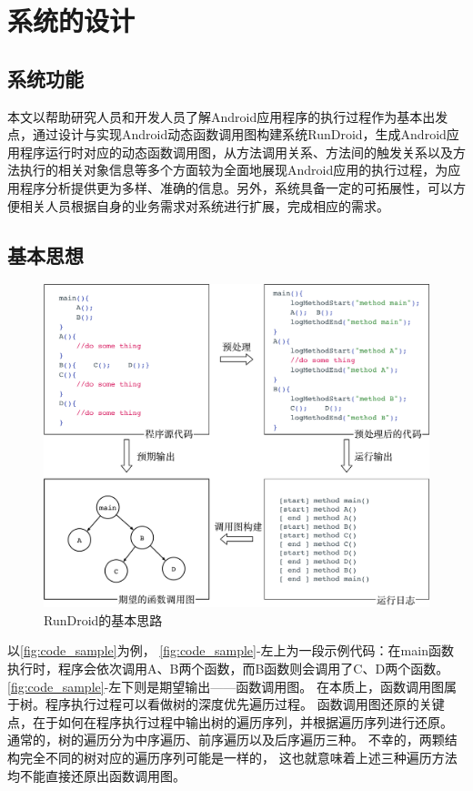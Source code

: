 \chapter{系统的设计}
\label{chp:design}


\section{系统功能}
本文以帮助研究人员和开发人员了解Android应用程序的执行过程作为基本出发点，通过设计与实现Android动态函数调用图构建系统RunDroid，生成Android应用程序运行时对应的动态函数调用图，从方法调用关系、方法间的触发关系以及方法执行的相关对象信息等多个方面较为全面地展现Android应用的执行过程，为应用程序分析提供更为多样、准确的信息。另外，系统具备一定的可拓展性，可以方便相关人员根据自身的业务需求对系统进行扩展，完成相应的需求。

\section{基本思想}



\begin{figure}[!ht]
	\centering
	\includegraphics[width=\textwidth]{./Figures/code-sample.png}
	\caption{RunDroid的基本思路}
	\label{fig:code_sample}
\end{figure}


以\autoref{fig:code_sample}为例，%
\autoref{fig:code_sample}-左上为一段示例代码：在main函数执行时，程序会依次调用A、B两个函数，而B函数则会调用了C、D两个函数。
\autoref{fig:code_sample}-左下则是期望输出——函数调用图。
在本质上，函数调用图属于树。程序执行过程可以看做树的深度优先遍历过程。
函数调用图还原的关键点，在于如何在程序执行过程中输出树的遍历序列，并根据遍历序列进行还原。
通常的，树的遍历分为中序遍历、前序遍历以及后序遍历三种。
不幸的，两颗结构完全不同的树对应的遍历序列可能是一样的，
这也就意味着上述三种遍历方法均不能直接还原出函数调用图。

